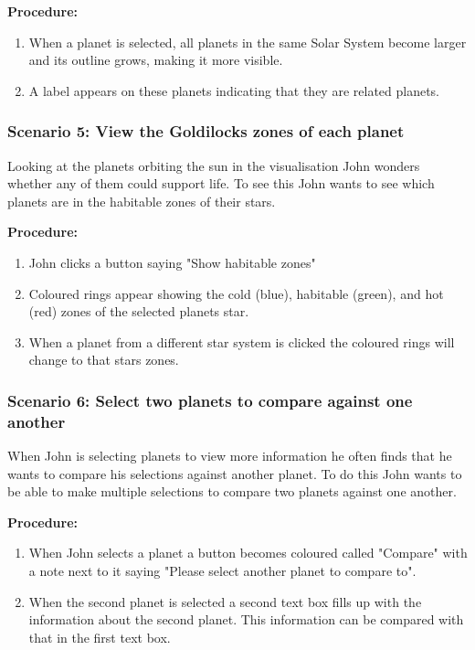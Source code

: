   {\bf  Procedure:}
   \begin{enumerate}
 \item When a planet is selected, all planets in the same Solar System become
larger and its outline grows, making it more visible.
 \item A label appears on these planets indicating that they are related
planets.
 \end{enumerate}
 
  
 \subsubsection{Scenario 5: View the Goldilocks zones of each planet}
   Looking at the planets orbiting the sun in the visualisation John wonders
whether any of them could support life. To see this John wants to see which
planets are in the habitable zones of their stars. 
 
  {\bf  Procedure:}
   \begin{enumerate}
 \item John clicks a button saying "Show habitable zones"
 \item Coloured rings appear showing the cold (blue), habitable (green), and hot
(red) zones of the selected planets star.
 \item When a planet from a different star system is clicked the coloured rings
will change to that stars zones.
 \end{enumerate}
 
  \subsubsection{Scenario 6: Select two planets to compare against one another}
When John is selecting planets to view more information he often finds that he wants to compare his selections against another planet. To do this John wants to be able to make multiple selections to compare two planets against one another.
  
  {\bf  Procedure:}
   \begin{enumerate}
 \item When John selects a planet a button becomes coloured called "Compare"
with a note next to it saying "Please select another planet to compare to".
 \item When the second planet is selected a second text box fills up with the
information about the second planet. This information can be compared with that
in the first text box.
  \end{enumerate}

